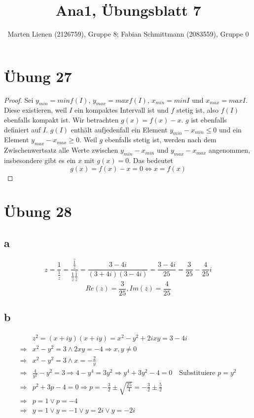\documentclass[a4paper,10pt]{article}
\title{Ana1, Übungsblatt 7}
\author{Marten Lienen (2126759), Gruppe 8; Fabian Schmittmann (2083559), Gruppe 0}
\begin{document}
\maketitle

\section*{Übung 27}

\begin{proof}
 Sei $y_{min} = min f(I)$, $y_{max} = max f(I)$, $x_{min} = min I$ und $x_{max} = max I$.
 Diese existieren, weil $I$ ein kompaktes Intervall ist und $f$ stetig ist, also $f(I)$ ebenfalls kompakt ist.
 Wir betrachten $g(x) = f(x) - x$.
 $g$ ist ebenfalls definiert auf $I$.
 $g(I)$ enthält aufjedenfall ein Element $y_{min} - x_{min} \le 0$ und ein Element $y_{max} - x_{max} \ge 0$.
 Weil $g$ ebenfalls stetig ist, werden nach dem Zwischenwertsatz alle Werte zwischen $y_{min} - x_{min}$ und $y_{max} - x_{max}$ angenommen, insbesondere gibt es ein $x$ mit $g(x) = 0$.
 Das bedeutet
 \begin{equation}
  g(x) = f(x) - x = 0 \Leftrightarrow x = f(x)
 \end{equation}
\end{proof}

\section*{Übung 28}

\subsection*{a}

\begin{equation}
 z = \frac{1}{\frac{1}{z}} = \frac{\bar{\frac{1}{z}}}{\frac{1}{z}\bar{\frac{1}{z}}} = \frac{3 - 4i}{(3 + 4i)(3 - 4i)} = \frac{3 - 4i}{25} = \frac{3}{25} - \frac{4}{25}i
\end{equation}
\begin{equation}
 Re(z) = \frac{3}{25}, Im(z) = \frac{4}{25}
\end{equation}

\subsection*{b}

\begin{align}
 & z^2 = (x + iy)(x + iy) = x^2 - y^2 + 2ixy = 3 - 4i\\
 \Rightarrow & x^2 - y^2 = 3 \land 2xy = -4 \Rightarrow \text{$x, y \ne 0$}\\
 \Rightarrow & x^2 - y^2 = 3 \land x = -\frac{2}{y}\\
 \Rightarrow & \frac{4}{y^2} - y^2 = 3 \Rightarrow 4 - y^4 = 3y^2 \Rightarrow y^4 + 3y^2 - 4 = 0 \quad \text{Substituiere $p = y^2$}\\
 \Rightarrow & p^2 + 3p - 4 = 0 \Rightarrow p = -\frac{3}{2} \pm \sqrt{\frac{25}{4}} = -\frac{3}{2} \pm \frac{5}{2}\\
 \Rightarrow & p = 1 \lor p = -4\\
 \Rightarrow & y = 1 \lor y = -1 \lor y = 2i \lor y = -2i
\end{align}
\end{document}
